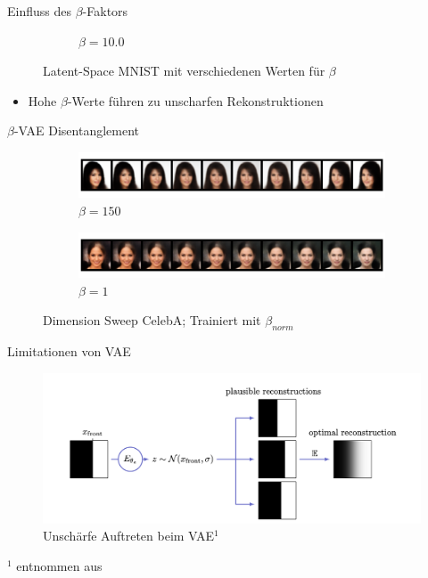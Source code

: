 \documentclass[10pt, compress]{beamer}
\begin{document}
\begin{frame}{Einfluss des $\beta$-Faktors}
\begin{minipage}[c]{\textwidth}
\begin{figure}[hbt]
\begin{subfigure}{.24\textwidth}
  \caption{$\beta = 10.0$}
\end{subfigure}
\caption{Latent-Space MNIST mit verschiedenen Werten für $\beta$}
\end{figure}
\end{minipage}
\begin{itemize}
  \item Hohe $\beta$-Werte führen zu unscharfen Rekonstruktionen
\end{itemize}
\end{frame}

\begin{frame}{$\beta$-VAE Disentanglement}
\centering
\begin{minipage}[c]{\textwidth}
  \begin{figure}[hbt]
  \centering
  \begin{subfigure}{\textwidth}
    \centering
    \includegraphics[width=\textwidth]{gfx/evaluation/celeba/CelebA-Rotation_1}
    \caption{$\beta = 150$}
  \end{subfigure}
  \begin{subfigure}{\textwidth}
    \centering
    \includegraphics[width=\textwidth]{gfx/evaluation/celeba/regular-face-color}
    \caption{$\beta = 1$}
  \end{subfigure}
  \caption{Dimension Sweep CelebA; Trainiert mit $\beta_{norm}$}
  \end{figure}
\end{minipage}
\end{frame}

\begin{frame}{Limitationen von VAE}
  \begin{figure}[H]
  \centering
  \includegraphics[width=.8\textwidth]{gfx/evaluation/recon_blur}
  \caption{Unschärfe Auftreten beim VAE$^1$}
  \label{fig:blur_explained}
\end{figure}
\vfill
{\tiny $^1$ entnommen aus \cite{Plumerault2020}}
\end{frame}
\end{document}
